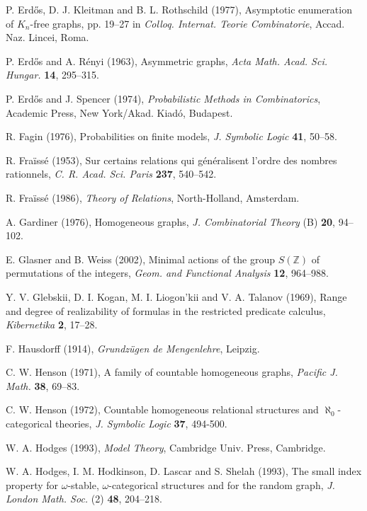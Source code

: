 \documentclass[12pt]{article}
\begin{document}
\begin{thebibliography}{99}
P. Erd\H{o}s, D. J. Kleitman and B. L. Rothschild (1977),
Asymptotic enumeration of $K_n$-free graphs,
pp. 19--27 in \textit{Colloq. Internat. Teorie Combinatorie},
Accad. Naz. Lincei, Roma.

P. Erd\H{o}s and A. R\'{e}nyi (1963),
Asymmetric graphs,
\textit{Acta Math. Acad. Sci. Hungar.} \textbf{14}, 295--315.

P. Erd\H{o}s and J. Spencer (1974),
\textit{Probabilistic Methods in Combinatorics},
Academic Press, New York/Akad. Kiad\'{o}, Budapest.

 R. Fagin (1976),
Probabilities on finite models,
\textit{J. Symbolic Logic} \textbf{41}, 50--58.

R. Fra\"{i}ss\'{e} (1953),
Sur certains relations qui g\'{e}n\'{e}ralisent l'ordre des nombres
rationnels,
\textit{C. R. Acad. Sci. Paris} \textbf{237}, 540--542.

R. Fra\"{i}ss\'{e} (1986),
\textit{Theory of Relations}, North-Holland, Amsterdam.

A. Gardiner (1976),
Homogeneous graphs,
\textit{J. Combinatorial Theory} (B) \textbf{20}, 94--102.

E. Glasner and B. Weiss (2002),
Minimal actions of the group $S(\mathbb{Z})$ of permutations of the integers,
\textit{Geom. and Functional Analysis} \textbf{12}, 964--988.

Y. V. Glebskii, D. I. Kogan, M. I. Liogon'kii and V. A. Talanov (1969),
Range and degree of realizability of formulas in the restricted predicate
calculus,
\textit{Kibernetika} \textbf{2}, 17--28.

F. Hausdorff (1914),
\textit{Grundz\"{u}gen de Mengenlehre}, Leipzig.

C. W. Henson (1971),
A family of countable homogeneous graphs,
\textit{Pacific J. Math.} \textbf{38}, 69--83.

C. W. Henson (1972),
Countable homogeneous relational structures and $\aleph_0$-categorical theories,
\textit{J. Symbolic Logic} \textbf{37}, 494-500.

W. A. Hodges (1993),
\textit{Model Theory},
Cambridge Univ. Press, Cambridge.

W. A. Hodges, I. M. Hodkinson, D. Lascar and S. Shelah (1993),
The small index property for $\omega$-stable, $\omega$-categorical structures
and for the random graph,
\textit{J. London Math. Soc.} (2) \textbf{48}, 204--218.


\end{thebibliography}
\end{document}
